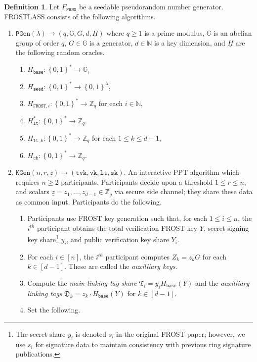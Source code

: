 \documentclass[11pt]{article}
\theoremstyle{definition}
\newtheorem{definition}[definition]{Definition}
\newcommand{\G}{\mathbb{G}}
\newcommand{\lt}{\texttt{lt}}
\newcommand{\tvk}{\texttt{tvk}}
\newcommand{\SK}{\underline{\texttt{sk}}}
\newcommand{\VK}{\underline{\texttt{vk}}}
\newcommand{\LT}{\underline{\texttt{lt}}}
\newcommand{\seed}{\texttt{seed}}
\newcommand{\bitstrings}{\left\{0,1\right\}^*}
\newcommand{\Zq}{\mathbb{Z}_q}
\newcommand{\bbn}{\mathbb{N}}
\newcommand{\secpar}{\lambda}
\newcommand{\setup}{\texttt{PGen}}
\newcommand{\keygen}{\texttt{KGen}}
\newcommand{\FROST}{\texttt{FROST}}
\begin{document}
\begin{definition} \label{def:frostlass}
Let $F_{\texttt{PRNG}}$ be a seedable pseudorandom number generator. FROSTLASS consists of the following algorithms. 
\begin{enumerate}
\item $\setup(\secpar) \to (q,\G, G, d, \underline{H})$ where $q \geq 1$ is a prime modulus, $\G$ is an abelian group of order $q$, $G \in \G$ is a generator, $d \in \bbn$ is a key dimension, and $\underline{H}$ are the following random oracles.
\begin{enumerate}
\item $H_{\texttt{base}}:\bitstrings \to \G$,
\item $H_{\seed}:\bitstrings \to \left\{0,1\right\}^\secpar$,
\item $H_{\FROST,i}:\bitstrings \to \Zq$ for each $i \in \mathbb{N}$,
\item $H_{\lt}^*:\bitstrings \to \Zq$.
\item $H_{\lt,k}:\bitstrings \to \Zq$ for each $1 \leq k \leq d-1$,
\item $H_{\texttt{ch}}:\bitstrings \to \Zq$.
\end{enumerate}
\item $\keygen(n, r, \underline{z}) \to (\tvk, \VK, \LT, \SK)$. 
An interactive PPT algorithm which requires $n \geq 2$ participants.  Participants decide upon  a threshold $1 \leq r \leq n$, and scalars $\underline{z} = z_1, \ldots, z_{d-1} \in \Zq$ via secure side channel; they share these data as common input.  Participants do the following. 
\begin{enumerate}
\item Participants use FROST key generation such that, for each $1 \leq i \leq n$, the $i^{th}$ participant obtains the total verification FROST key $Y$, secret signing key share\footnote{The secret share $y_i$ is denoted $s_i$ in the original FROST paper; however, we use $s_i$ for signature data to maintain consistency with previous ring signature publications.}  $y_i$, and public verification key share $Y_i$.
\item For each $i \in [n]$, the $i^{th}$ participant computes $Z_k = z_k G$ for each $k \in [d-1]$. These are called the \textit{auxilliary keys}.
\item Compute the \textit{main linking tag share} $\mathfrak{T}_i = y_i H_{\texttt{base}}(Y)$ and the \textit{auxilliary linking tags} $\mathfrak{D}_k = z_k \cdot H_{\texttt{base}}(Y)$ for $k \in [d-1]$.
\item Set the following.

\end{enumerate}
\end{enumerate}
\end{definition}
\end{document}

